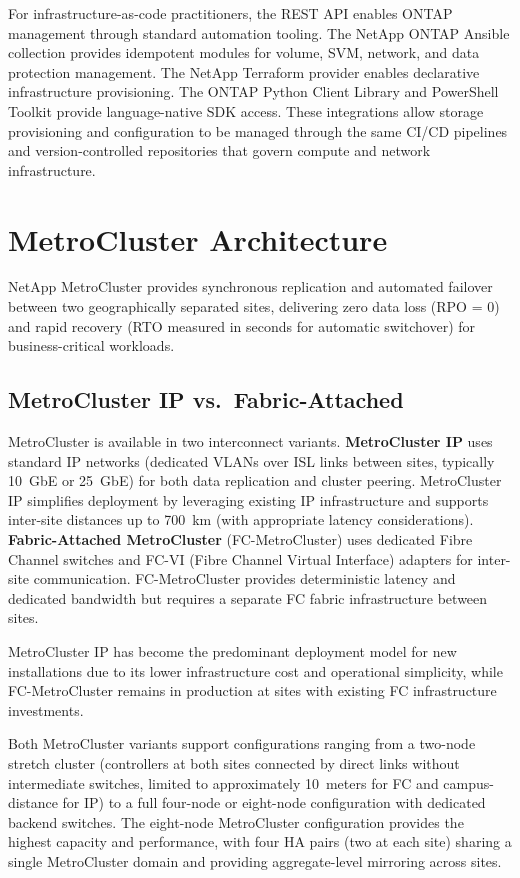 For infrastructure-as-code practitioners, the REST API enables ONTAP management through standard automation tooling. The NetApp ONTAP Ansible collection provides idempotent modules for volume, SVM, network, and data protection management. The NetApp Terraform provider enables declarative infrastructure provisioning. The ONTAP Python Client Library and PowerShell Toolkit provide language-native SDK access. These integrations allow storage provisioning and configuration to be managed through the same CI/CD pipelines and version-controlled repositories that govern compute and network infrastructure.

\section{MetroCluster Architecture}

NetApp MetroCluster provides synchronous replication and automated failover between two geographically separated sites, delivering zero data loss (RPO = 0) and rapid recovery (RTO measured in seconds for automatic switchover) for business-critical workloads.

\subsection{MetroCluster IP vs.\ Fabric-Attached}

MetroCluster is available in two interconnect variants. \textbf{MetroCluster IP} uses standard IP networks (dedicated VLANs over ISL links between sites, typically 10~GbE or 25~GbE) for both data replication and cluster peering. MetroCluster IP simplifies deployment by leveraging existing IP infrastructure and supports inter-site distances up to 700~km (with appropriate latency considerations). \textbf{Fabric-Attached MetroCluster} (FC-MetroCluster) uses dedicated Fibre Channel switches and FC-VI (Fibre Channel Virtual Interface) adapters for inter-site communication. FC-MetroCluster provides deterministic latency and dedicated bandwidth but requires a separate FC fabric infrastructure between sites.

MetroCluster IP has become the predominant deployment model for new installations due to its lower infrastructure cost and operational simplicity, while FC-MetroCluster remains in production at sites with existing FC infrastructure investments.

Both MetroCluster variants support configurations ranging from a two-node stretch cluster (controllers at both sites connected by direct links without intermediate switches, limited to approximately 10~meters for FC and campus-distance for IP) to a full four-node or eight-node configuration with dedicated backend switches. The eight-node MetroCluster configuration provides the highest capacity and performance, with four HA pairs (two at each site) sharing a single MetroCluster domain and providing aggregate-level mirroring across sites.

